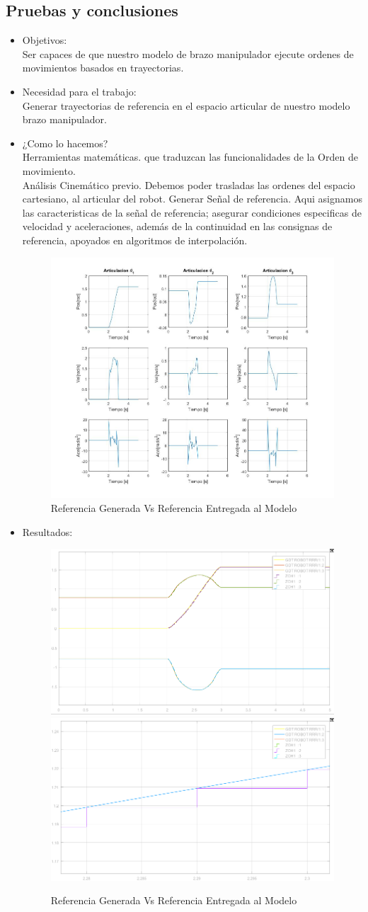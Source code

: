 	\subsection{Pruebas y conclusiones}
	\begin{itemize}
		\item Objetivos: \\
		Ser capaces de que nuestro modelo de brazo manipulador ejecute ordenes de movimientos basados en trayectorias.\\

		\item Necesidad para el trabajo: \\
		Generar trayectorias de referencia en el espacio articular de nuestro modelo brazo manipulador.\\

		\item ¿Como lo hacemos? \\
		Herramientas matemáticas. que traduzcan las funcionalidades de la Orden de movimiento. \\
		Análisis Cinemático previo. Debemos poder trasladas las ordenes del espacio cartesiano, al articular del robot.
		Generar Señal de referencia. Aqui asignamos las caracteristicas de la señal de referencia; asegurar condiciones
		especificas de velocidad y aceleraciones, además de la continuidad en las consignas de referencia, apoyados en algoritmos
		de interpolación.

		\begin{figure}[h!]
			\centering
			\includegraphics[width=.4\textwidth]{GeneradorTrayLineal}
			\caption{Referencia Generada Vs Referencia Entregada al Modelo}
		\end{figure}

		\newpage
		\item Resultados:
		\begin{figure}[h!]
			\centering
			\includegraphics[width=.4\textwidth]{ZoHComparativa} \hspace{0.2cm} \includegraphics[width=.4\textwidth]{ZoHComparativaDetalle}
			\caption{Referencia Generada Vs Referencia Entregada al Modelo}
		\end{figure}




	\end{itemize}
